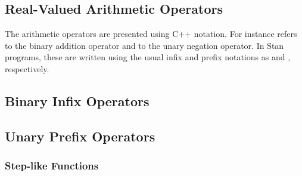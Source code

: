 \begin{description}
\begin{description}
\begin{description}
\begin{description}
\begin{description}
\begin{description}
\begin{description}
\begin{description}
\begin{description}
\begin{description}
\begin{description}
\section{Real-Valued Arithmetic Operators}

The arithmetic operators are presented using C++ notation.  For instance  refers to the binary addition operator and  to the unary negation operator.  In Stan programs, these are written using the usual infix and prefix notations as  and , respectively.

\subsection{Binary Infix Operators}

\begin{description}   %

\subsection{Unary Prefix Operators}

\begin{description}   %



\section{Step-like Functions}


\end{description}
\end{description}
\end{description}
\end{description}
\end{description}
\end{description}
\end{description}
\end{description}
\end{description}
\end{description}
\end{description}
\end{description}
\end{description}
